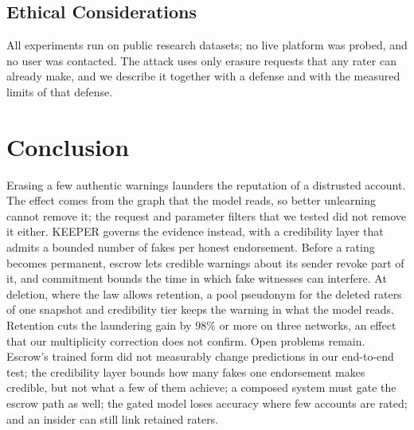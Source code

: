 \documentclass[lettersize,journal]{IEEEtran}
\begin{document}
\subsection{Ethical Considerations}
\label{subsec:ethics}

All experiments run on public research datasets; no live platform was probed, and no user was contacted.
The attack uses only erasure requests that any rater can already make, and we describe it together with a defense and with the measured limits of that defense.

\section{Conclusion}
\label{sec:conclusion}

Erasing a few authentic warnings launders the reputation of a distrusted account. The effect comes from the graph that the model reads, so better unlearning cannot remove it; the request and parameter filters that we tested did not remove it either.
KEEPER governs the evidence instead, with a credibility layer that admits a bounded number of fakes per honest endorsement.
Before a rating becomes permanent, escrow lets credible warnings about its sender revoke part of it, and commitment bounds the time in which fake witnesses can interfere.
At deletion, where the law allows retention, a pool pseudonym for the deleted raters of one snapshot and credibility tier keeps the warning in what the model reads. Retention cuts the laundering gain by $98\%$ or more on three networks, an effect that our multiplicity correction does not confirm.
Open problems remain. Escrow's trained form did not measurably change predictions in our end-to-end test; the credibility layer bounds how many fakes one endorsement makes credible, but not what a few of them achieve; a composed system must gate the escrow path as well; the gated model loses accuracy where few accounts are rated; and an insider can still link retained raters.
\end{document}
